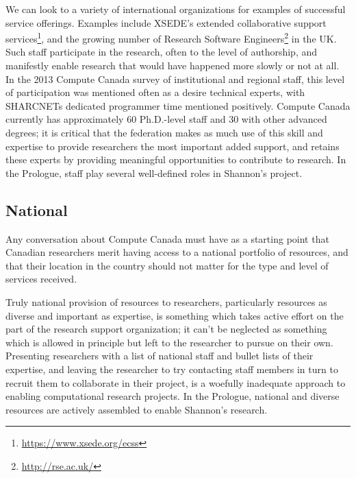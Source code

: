 \documentclass[11pt, letterpaper, twoside]{article}
\begin{document}
We can look to a variety of international organizations for examples of
successful service offerings. Examples include XSEDE's extended
collaborative support services\footnote{\url{https://www.xsede.org/ecss}}, and the growing
number of Research Software Engineers\footnote{\url{http://rse.ac.uk/}} in the UK.  Such
staff participate in the research, often to the level of authorship, and
manifestly enable research that would have happened more slowly or not
at all. In the 2013 Compute Canada survey of institutional and regional
staff, this level of participation was mentioned often as a desire
technical experts, with SHARCNETs dedicated programmer time mentioned
positively. Compute Canada currently has approximately 60 Ph.D.-level
staff and 30 with other advanced degrees; it is critical that the
federation makes as much use of this skill and expertise to provide
researchers the most important added support, and retains these experts
by providing meaningful opportunities to contribute to research. In the
Prologue, staff play several well-defined roles in Shannon's project.

\subsection*{National}
%

Any conversation about Compute Canada must have as a starting point that
Canadian researchers merit having access to a national portfolio of
resources, and that their location in the country should not matter for
the type and level of services received.


Truly national provision of resources to researchers, particularly
resources as diverse and important as expertise, is something which
takes active effort on the part of the research support organization; it
can't be neglected as something which is allowed in principle but left
to the researcher to pursue on their own. Presenting researchers with a
list of national staff and bullet lists of their expertise, and leaving
the researcher to try contacting staff members in turn to recruit them
to collaborate in their project, is a woefully inadequate approach to
enabling computational research projects. In the Prologue, national and
diverse resources are actively assembled to enable Shannon's research.
\end{document}
